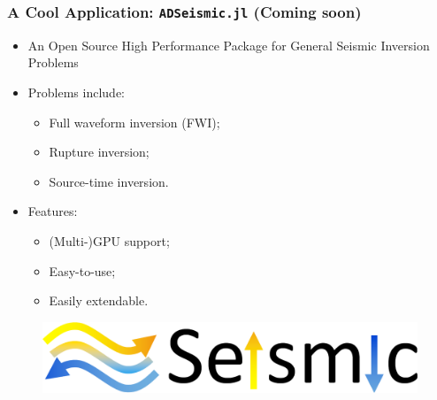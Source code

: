 \documentclass{beamer}
\begin{document}
\begin{frame}
	\frametitle{A Cool Application: \texttt{ADSeismic.jl} (Coming soon)}
	\begin{itemize}
		\item An Open Source High Performance Package for General Seismic Inversion Problems
		\item Problems include:
		\begin{itemize}
		\item Full waveform inversion (FWI);
\item Rupture inversion;
\item Source-time inversion.
		\end{itemize}
		\item Features:
		\begin{itemize}
		\item (Multi-)GPU support;
		\item Easy-to-use;
		\item Easily extendable.
		\end{itemize}
	\end{itemize}
	
	\begin{figure}[hbt]
	 \includegraphics[width=1.0\textwidth]{../adseismic.png}
\end{figure}
\end{frame}


\end{document}
